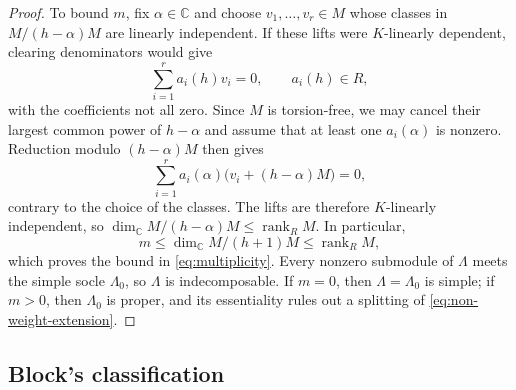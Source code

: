 \documentclass[11pt,reqno]{amsart}
\numberwithin{equation}{section}
\newcommand{\C}{\mathbb C}
\DeclareMathOperator{\rank}{rank}
\theoremstyle{definition}
\theoremstyle{remark}
\begin{document}
\begin{proof}
To bound \(m\), fix \(\alpha\in\C\) and choose
\(v_1,\ldots,v_r\in M\) whose classes in
\(M/(h-\alpha)M\) are linearly independent.
If these lifts were \(K\)-linearly dependent, clearing denominators
would give
\[
\sum_{i=1}^r a_i(h)v_i=0,\qquad a_i(h)\in R,
\]
with the coefficients not all zero. Since \(M\) is torsion-free,
we may cancel their largest common power of \(h-\alpha\) and
assume that at least one \(a_i(\alpha)\) is nonzero. Reduction modulo
\((h-\alpha)M\) then gives
\[
\sum_{i=1}^r a_i(\alpha)\bigl(v_i+(h-\alpha)M\bigr)=0,
\]
contrary to the choice of the classes. The lifts are therefore
\(K\)-linearly independent, so
\(\dim_\C M/(h-\alpha)M\le\rank_R M\). In particular,
\[
m\le\dim_\C M/(h+1)M\le\rank_R M,
\]
which proves the bound in \eqref{eq:multiplicity}.
Every nonzero submodule of \(\Lambda\) meets the simple socle
\(\Lambda_0\), so \(\Lambda\) is indecomposable. If \(m=0\),
then \(\Lambda=\Lambda_0\) is simple; if \(m>0\), then
\(\Lambda_0\) is proper, and its essentiality rules out a
splitting of \eqref{eq:non-weight-extension}.
\end{proof}

\subsection{Block's classification}\label{subsec:block}
\end{document}
